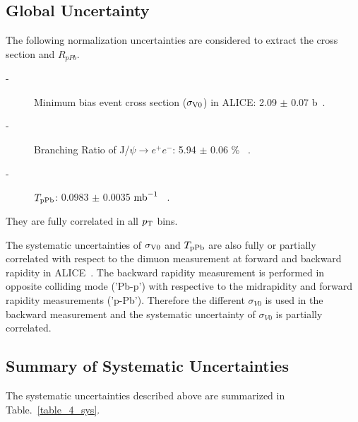\subsection{Global Uncertainty}
The following normalization uncertainties are considered to extract the cross section and $R_{pPb}$. 
\begin{description}
  \item[-] Minimum bias event cross section ($\sigma_{\rm{V0}}$) in ALICE: 2.09 $\pm$ 0.07 b~\cite{bib_v0cross}.
  \item[-] Branching Ratio of J/$\psi\rightarrow e^{+}e^{-}$: 5.94 $\pm$ 0.06 \% ~\cite{bib_pdg}.
  \item[-] $T_{\rm{pPb}}$: 0.0983 $\pm$ 0.0035 $\rm{mb}^{-1}$ ~\cite{bib_tppb}.
\end{description}
They are fully correlated in all $p_{\rm{T}}$ bins. 

The systematic uncertainties of $\sigma_{\rm{V0}}$ and $T_{\rm{pPb}}$ are also fully or partially correlated with respect to the dimuon measurement at forward and backward rapidity in ALICE~\cite{bib_alicemuon}. 
The backward rapidity measurement is performed in opposite colliding mode ('Pb-p') with respective to the midrapidity and forward rapidity measurements ('p-Pb'). 
Therefore the different $\sigma_{V0}$ is used in the backward measurement and the systematic uncertainty of $\sigma_{V0}$ is partially correlated.  


\subsection{Summary of Systematic Uncertainties}
The systematic uncertainties described above are summarized in Table.~\ref{table_4_sys}.

